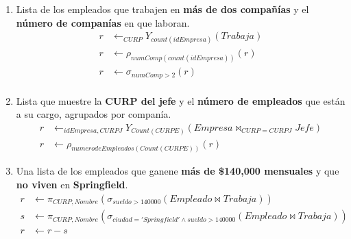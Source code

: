 \documentclass{article}
\begin{document}
\begin{enumerate}
{{\begin{enumerate}
{\begin{align*}
                         Trabaja & \leftarrow Trabaja - t -w \\
                         Trabaja & \leftarrow Trabaja \cup r \cup s \\
                         \end{align*}
                    }
                    \item {
                        Lista de los empleados que trabajen en \textbf{más de
                        dos compañías} y el \textbf{número de companías} en que 
                        laboran.
                         \begin{align*}
                         r & \leftarrow _{CURP}Y_{count(idEmpresa)}(Trabaja)\\
                         r & \leftarrow \rho_{numComp(count(idEmpresa))}(r)\\
                         r & \leftarrow \sigma_{numComp > 2}(r)\\
                         \end{align*}
                    }
                    \item {
                        Lista que muestre la \textbf{CURP del jefe} y el
                        \textbf{número de empleados} que están a su cargo,
                        agrupados por companía.
                         \begin{align*}                         
                         r & \leftarrow _{idEmpresa,CURPJ}Y_{Count(CURPE)}(Empresa\bowtie_{CURP = CURPJ} Jefe )\\
                         r & \leftarrow \rho_{numerodeEmpleados(Count(CURPE))}(r)
                         \end{align*}
                    }
                    \item {
                        Una lista de los empleados que ganene \textbf{más de 
                        \$140,000 mensuales} y que \textbf{no viven} en
                        \textbf{Springfield}.
                        \begin{align*}
                        	r & \leftarrow \pi_{CURP,Nombre} (\sigma_{sueldo >140000}(Empleado \bowtie Trabaja))\\
                        	s & \leftarrow \pi_{CURP,Nombre} (\sigma_{ciudad= 'Springfield'\wedge sueldo >140000 }(Empleado \bowtie Trabaja))\\
                        	r & \leftarrow r-s\\                        	
                        \end{align*}
}
\end{enumerate}}}
\end{enumerate}
\end{document}
